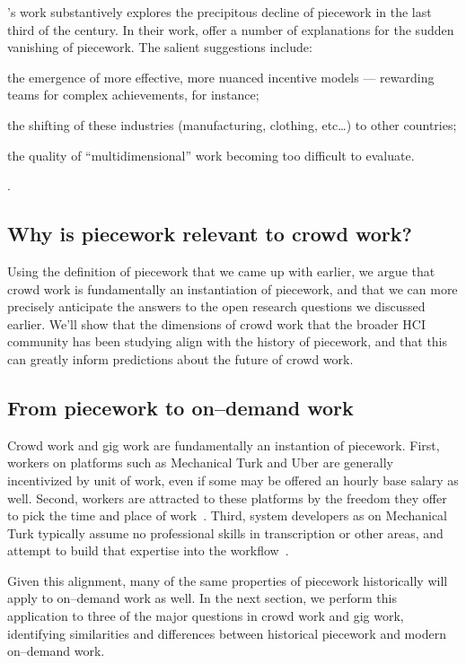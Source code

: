 \documentclass[trackingWork]{subfiles}
\begin{document}
\citeauthor{hart2013rise}'s work substantively explores the precipitous decline of piecework in the last third of the  century.
In their work, \citeauthor{hart2013rise} offer a number of explanations for the sudden vanishing of piecework.
The salient suggestions include:
\begin{inlinelist}
\item the emergence of more effective, more nuanced incentive models
--- rewarding teams for complex achievements, for instance;
\item the shifting of these industries (manufacturing, clothing, etc\dots)
to other countries;
\item the quality of ``multidimensional'' work becoming too difficult to evaluate.
\end{inlinelist}
\cite{hart2013rise}.



\subsection{Why is piecework relevant to crowd work?}

Using the definition of piecework that we came up with earlier, we argue that
crowd work is fundamentally an instantiation of piecework, and
that we can more precisely anticipate the answers to the open research questions we discussed earlier.
We'll show that the dimensions of crowd work that the broader HCI community has been studying
align with the history of piecework, and that this can greatly inform predictions about the future of crowd work.
\subsection{From piecework to on--demand work}
Crowd work and gig work are fundamentally an instantion of piecework.
First, workers on platforms such as Mechanical Turk and Uber are generally incentivized by unit of work, even if some may be offered an hourly base salary as well.
Second, workers are attracted to these platforms by the freedom they offer to pick the time and place of work~\cite{martin2014being,whyWouldAnyoneBrewer}.
Third, system developers as on Mechanical Turk typically assume no professional skills in transcription or other areas, and attempt to build that expertise into the workflow~\cite{noronha2011platemate,bernsteinSoylent}.

Given this alignment, many of the same properties of piecework historically will apply to on--demand work as well. In the next section, we perform this application to three of the major questions in crowd work and gig work, identifying similarities and differences between historical piecework and modern on--demand work.

\onlyinsubfile{
  \printbibliography
  }
\end{document}
